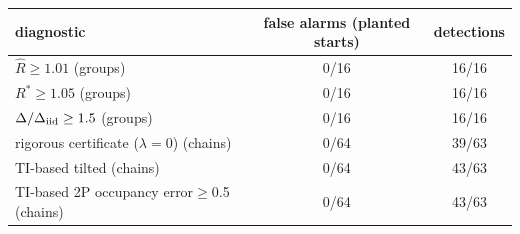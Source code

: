 \begin{tabular}{lcc}
\toprule
diagnostic & false alarms (planted starts) & detections \\
\midrule
$\widehat R\ge1.01$ (groups) & 0/16 & 16/16 \\
$R^\ast\ge1.05$ (groups) & 0/16 & 16/16 \\
$\Delta/\Delta_{\rm iid}\ge1.5$ (groups) & 0/16 & 16/16 \\
rigorous certificate ($\lambda{=}0$) (chains) & 0/64 & 39/63 \\
TI-based tilted (chains) & 0/64 & 43/63 \\
TI-based 2P occupancy error$\ge$0.5 (chains) & 0/64 & 43/63 \\
\bottomrule
\end{tabular}
